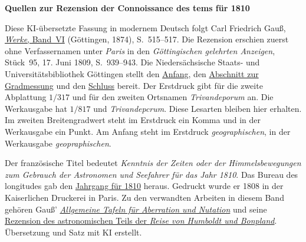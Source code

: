 \clearpage\thispagestyle{empty}
\begin{center}\textbf{Quellen zur Rezension der Connoissance des tems für 1810}\end{center}
\noindent Diese KI-übersetzte Fassung in modernem Deutsch folgt Carl Friedrich Gauß, \href{https://gdz.sub.uni-goettingen.de/id/PPN236007467}{\emph{Werke}, Band~VI} (Göttingen, 1874), S.~515–517. Die Rezension erschien zuerst ohne Verfassernamen unter \emph{Paris} in den \emph{Göttingischen gelehrten Anzeigen}, Stück~95, 17. Juni 1809, S.~939–943. Die Niedersächsische Staats- und Universitätsbibliothek Göttingen stellt den \href{https://images.p.sub.uni-goettingen.de/iiif/image/gdz:PPN319721507_1809:00000941/full/1650,/0/default.jpg}{Anfang}, den \href{https://images.p.sub.uni-goettingen.de/iiif/image/gdz:PPN319721507_1809:00000943/full/1650,/0/default.jpg}{Abschnitt zur Gradmessung} und den \href{https://images.p.sub.uni-goettingen.de/iiif/image/gdz:PPN319721507_1809:00000945/full/1650,/0/default.jpg}{Schluss} bereit. Der Erstdruck gibt für die zweite Abplattung $1/317$ und für den zweiten Ortsnamen \emph{Trivandeporum} an. Die Werkausgabe hat $1/817$ und \emph{Trivandepcrum}. Diese Lesarten bleiben hier erhalten. Im zweiten Breitengradwert steht im Erstdruck ein Komma und in der Werkausgabe ein Punkt. Am Anfang steht im Erstdruck \emph{geographischen}, in der Werkausgabe \emph{geopraphischen}.
\par\smallskip\noindent Der französische Titel bedeutet \emph{Kenntnis der Zeiten oder der Himmelsbewegungen zum Gebrauch der Astronomen und Seefahrer für das Jahr 1810}. Das Bureau des longitudes gab den \href{https://cdt.imcce.fr/items/show/159}{Jahrgang für 1810} heraus. Gedruckt wurde er 1808 in der Kaiserlichen Druckerei in Paris. Zu den verwandten Arbeiten in diesem Band gehören Gauß’ \hyperlink{native-128}{\emph{Allgemeine Tafeln für Aberration und Nutation}} und seine \hyperlink{native-517-lower}{Rezension des astronomischen Teils der \emph{Reise von Humboldt und Bonpland}}. Übersetzung und Satz mit KI erstellt.
\clearpage
